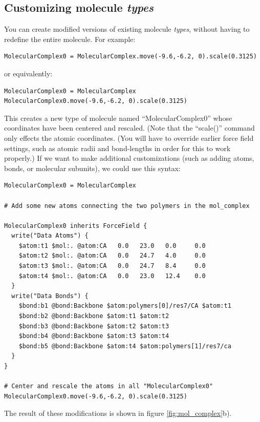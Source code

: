 \documentclass[11pt]{article}
\begin{document}
\subsection{Customizing molecule \textit{types}}
\label{sec:molecule_customization}
You can create modified versions of existing molecule \textit{types}, 
without having to redefine the entire molecule. For example:
\begin{verbatim}
MolecularComplex0 = MolecularComplex.move(-9.6,-6.2, 0).scale(0.3125)
\end{verbatim}
or equivalently:
\begin{verbatim}
MolecularComplex0 = MolecularComplex
MolecularComplex0.move(-9.6,-6.2, 0).scale(0.3125)
\end{verbatim}
This creates a new type of molecule named ``MolecularComplex0'' whose 
coordinates have been centered and rescaled.
(Note that the ``scale()'' command only effects the atomic coordinates.
(You will have to override earlier force field settings,
such as atomic radii and bond-lengths in order for this to work properly.)
If we want to make additional customizations
(such as adding atoms, bonds, or molecular subunits), we could use this syntax:
\begin{verbatim}
MolecularComplex0 = MolecularComplex

# Add some new atoms connecting the two polymers in the mol_complex

MolecularComplex0 inherits ForceField {
  write("Data Atoms") {
    $atom:t1 $mol:. @atom:CA   0.0   23.0   0.0     0.0
    $atom:t2 $mol:. @atom:CA   0.0   24.7   4.0     0.0
    $atom:t3 $mol:. @atom:CA   0.0   24.7   8.4     0.0
    $atom:t4 $mol:. @atom:CA   0.0   23.0   12.4    0.0
  }
  write("Data Bonds") {
    $bond:b1 @bond:Backbone $atom:polymers[0]/res7/CA $atom:t1
    $bond:b2 @bond:Backbone $atom:t1 $atom:t2
    $bond:b3 @bond:Backbone $atom:t2 $atom:t3
    $bond:b4 @bond:Backbone $atom:t3 $atom:t4
    $bond:b5 @bond:Backbone $atom:t4 $atom:polymers[1]/res7/ca
  }
}

# Center and rescale the atoms in all "MolecularComplex0"
MolecularComplex0.move(-9.6,-6.2, 0).scale(0.3125)
\end{verbatim}
The result of these modifications is shown in figure \ref{fig:mol_complex}b).
\end{document}
